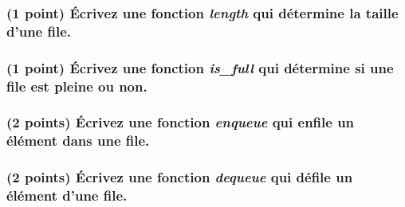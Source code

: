\documentclass[11pt,a4paper]{article}
\begin{document}
\bigskip

\begin{center}
\end{center}


\begin{center}
\begin{table}[ht!]
  \centering
  \begin{minipage}{0.48\textwidth}

\subsubsection{(1 point) \'Ecrivez une fonction \og \textit{length} \fg{} qui détermine la taille d'une file. }

\begin{center}
\end{center}

  \end{minipage}
  \hfillx
  \begin{minipage}{0.48\textwidth}

\subsubsection{(1 point) \'Ecrivez une fonction \og \textit{is\_full} \fg{} qui détermine si une file est pleine ou non. }

\begin{center}
\end{center}

  \end{minipage}
\end{table}
\end{center}


\clearpage


\subsubsection{(2 points) \'Ecrivez une fonction \og \textit{enqueue} \fg{} qui enfile un élément dans une file. }

\begin{center}
\end{center}


\subsubsection{(2 points) \'Ecrivez une fonction \og \textit{dequeue} \fg{} qui défile un élément d'une file. }
\end{document}
